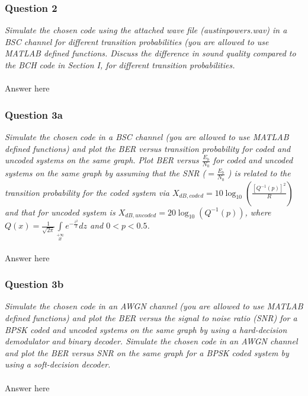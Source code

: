 \documentclass[a4paper]{article}
\begin{document}
\subsubsection*{Question 2} \textit{Simulate the chosen code using the attached wave file (austinpowers.wav) in a BSC channel for different transition probabilities (you are allowed to use MATLAB defined functions. Discuss the difference in sound quality compared to the BCH code in Section I, for different transition probabilities.}\\
\\
Answer here \\

\subsubsection*{Question 3a}\textit{Simulate the chosen code in a BSC channel (you are allowed to use MATLAB defined functions) and plot the BER versus transition probability for coded and uncoded systems on the same graph. Plot BER versus $\frac{E_b}{N_0}$ for coded and uncoded systems on the same graph by assuming that the SNR ($ = \frac{E_b}{N_0}$ ) is related to the transition probability for the coded system via $X_{dB,coded} = 10 \log_{10}(\frac{[Q^{−1} (p)]^2}{R}) $ and that for uncoded system is $X_{dB,uncoded} = 20\log_{10}(Q^{−1} (p)) $, where $Q(x) = \frac{1}{\sqrt{2 \pi}} \int\limits_{x}\limits^{+\infty} e^{ -\frac{z^2}{2}} dz $ and $0 < p < 0.5$.} \\
\\
Answer here \\

\subsubsection*{Question 3b} \textit{Simulate the chosen code in an AWGN channel (you are allowed to use MATLAB defined functions) and plot the BER versus the signal to noise ratio (SNR) for a BPSK coded and uncoded systems on the same graph by using a hard-decision demodulator and binary decoder. Simulate the chosen code in an AWGN channel and plot the BER versus SNR on the same graph for a BPSK coded system by using a soft-decision decoder.} \\
\\
Answer here \\
\end{document}
